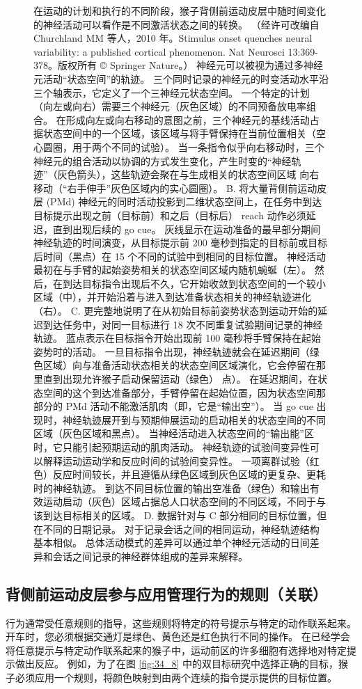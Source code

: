 \begin{figure}[htbp]
	\caption{在运动的计划和执行的不同阶段，猴子背侧前运动皮层中随时间变化的神经活动可以看作是不同激活状态之间的转换。 （经许可改编自 Churchland MM 等人，2010 年。Stimulus onset quenches neural variability: a published cortical phenomenon. Nat Neurosci 13:369-378。版权所有 © Springer Nature。） 神经元可以被视为通过多神经元活动“状态空间”的轨迹。 三个同时记录的神经元的时变活动水平沿三个轴表示，它定义了一个三神经元状态空间。 一个特定的计划（向左或向右）需要三个神经元（灰色区域）的不同预备放电率组合。 在形成向左或向右移动的意图之前，三个神经元的基线活动占据状态空间中的一个区域，该区域与将手臂保持在当前位置相关（空心圆圈，用于两个不同的试验）。 当一条指令似乎向右移动时，三个神经元的组合活动以协调的方式发生变化，产生时变的“神经轨迹”（灰色箭头），这些轨迹会聚在与生成相关的状态空间区域 向右移动（“右手伸手”灰色区域内的实心圆圈）。 B. 将大量背侧前运动皮层 (PMd) 神经元的同时活动投影到二维状态空间上，在任务中到达目标提示出现之前（目标前）和之后（目标后） reach 动作必须延迟，直到出现后续的 go cue。 灰线显示在运动准备的最早部分期间神经轨迹的时间演变，从目标提示前 200 毫秒到指定的目标前或目标后时间（黑点）在 15 个不同的试验中到相同的目标位置。 神经活动最初在与手臂的起始姿势相关的状态空间区域内随机蜿蜒（左）。 然后，在到达目标指令出现后不久，它开始收敛到状态空间的一个较小区域（中），并开始沿着与进入到达准备状态相关的神经轨迹进化（右）。 C. 更完整地说明了在从初始目标前姿势状态到运动开始的延迟到达任务中，对同一目标进行 18 次不同重复试验期间记录的神经轨迹。 蓝点表示在目标指令开始出现前 100 毫秒将手臂保持在起始姿势时的活动。 一旦目标指令出现，神经轨迹就会在延迟期间（绿色区域）向与准备活动状态相关的状态空间区域演化，它会停留在那里直到出现允许猴子启动保留运动（绿色） 点）。 在延迟期间，在状态空间的这个到达准备部分，手臂停留在起始位置，因为状态空间那部分的 PMd 活动不能激活肌肉（即，它是“输出空”）。 当 go cue 出现时，神经轨迹展开到与预期伸展运动的启动相关的状态空间的不同区域（灰色区域和黑点）。 当神经活动进入状态空间的“输出能”区时，它只能引起预期运动的肌肉活动。 神经轨迹的试验间变异性可以解释运动运动学和反应时间的试验间变异性。 一项离群试验（红色）反应时间较长，并且遵循从绿色区域到灰色区域的更复杂、更耗时的神经轨迹。 到达不同目标位置的输出空准备（绿色）和输出有效运动启动（灰色）区域占据总人口状态空间的不同区域，不同于与该到达目标相关的区域。 D. 数据针对与 C 部分相同的目标位置，但在不同的日期记录。 对于记录会话之间的相同运动，神经轨迹结构基本相似。 总体活动模式的差异可以通过单个神经元活动的日间差异和会话之间记录的神经群体组成的差异来解释。}
	\label{fig:34_10}
\end{figure}


\subsection{背侧前运动皮层参与应用管理行为的规则（关联）}
行为通常受任意规则的指导，这些规则将特定的符号提示与特定的动作联系起来。 开车时，您必须根据交通灯是绿色、黄色还是红色执行不同的操作。 在已经学会将任意提示与特定动作联系起来的猴子中，运动前区的许多细胞有选择地对特定提示做出反应。 例如，为了在图 \ref{fig:34_8} 中的双目标研究中选择正确的目标，猴子必须应用一个规则，将颜色映射到由两个连续的指令提示提供的目标位置。

